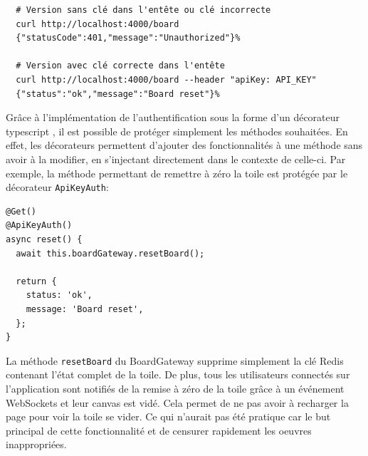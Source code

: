 \begin{verbatim}
  # Version sans clé dans l'entête ou clé incorrecte
  curl http://localhost:4000/board
  {"statusCode":401,"message":"Unauthorized"}%

  # Version avec clé correcte dans l'entête
  curl http://localhost:4000/board --header "apiKey: API_KEY"
  {"status":"ok","message":"Board reset"}%
\end{verbatim}

Grâce à l'implémentation de l'authentification sous la forme d'un décorateur \gls{typescript} \cite{typescript-decorators}, il est possible de protéger simplement les méthodes souhaitées. En effet, les décorateurs permettent d'ajouter des fonctionnalités à une méthode sans avoir à la modifier, en s'injectant directement dans le contexte de celle-ci. Par exemple, la méthode permettant de remettre à zéro la toile est protégée par le décorateur \texttt{ApiKeyAuth}:

\begin{verbatim}
@Get()
@ApiKeyAuth()
async reset() {
  await this.boardGateway.resetBoard();

  return {
    status: 'ok',
    message: 'Board reset',
  };
}
\end{verbatim}

La méthode \texttt{resetBoard} du BoardGateway supprime simplement la clé Redis contenant l'état complet de la toile. De plus, tous les utilisateurs connectés sur l'application sont notifiés de la remise à zéro de la toile grâce à un événement WebSockets et leur canvas est vidé. Cela permet de ne pas avoir à recharger la page pour voir la toile se vider. Ce qui n'aurait pas été pratique car le but principal de cette fonctionnalité et de censurer rapidement les oeuvres inappropriées.
